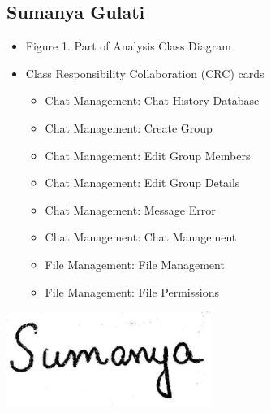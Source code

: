 \documentclass[]{article}
\begin{document}
\subsection{Sumanya Gulati}
\label{subsec:sumanya_gulati}
\begin{itemize}
	\item Figure 1. Part of Analysis Class Diagram
	\item Class Responsibility Collaboration (CRC) cards
 		\begin{itemize}
   			\item Chat Management: Chat History Database
      			\item Chat Management: Create Group
	 		\item Chat Management: Edit Group Members
    			\item Chat Management: Edit Group Details
       			\item Chat Management: Message Error
	  		\item Chat Management: Chat Management
     			\item File Management: File Management
			\item File Management: File Permissions
      		\end{itemize}
\end{itemize}
\includegraphics[width=0.5\textwidth]{signature.jpeg}
\end{document}
